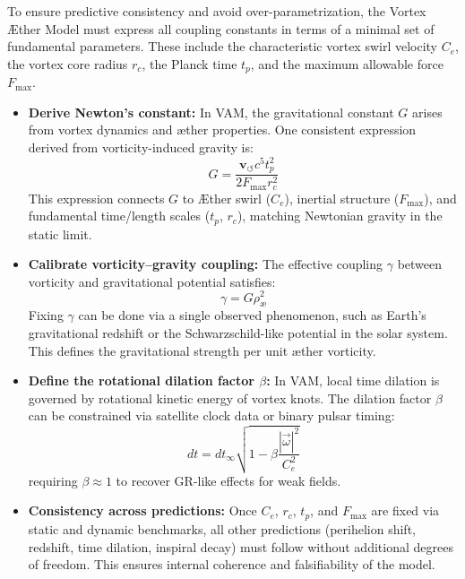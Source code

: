 To ensure predictive consistency and avoid over-parametrization, the Vortex Æther Model must express all coupling constants in terms of a minimal set of fundamental parameters. These include the characteristic vortex swirl velocity $C_e$, the vortex core radius $r_c$, the Planck time $t_p$, and the maximum allowable force $F_{\max}$.

\begin{itemize}
    \item \textbf{Derive Newton's constant:} In VAM, the gravitational constant $G$ arises from vortex dynamics and æther properties. One consistent expression derived from vorticity-induced gravity is:
    \begin{equation}
        G = \frac{\mathbf{v}_{\scriptscriptstyle\boldsymbol{\circlearrowleft}} c^5 t_p^2}{2 F_{\max} r_c^2}
    \end{equation}
    This expression connects $G$ to Æther swirl ($C_e$), inertial structure ($F_{\max}$), and fundamental time/length scales ($t_p$, $r_c$), matching Newtonian gravity in the static limit.

    \item \textbf{Calibrate vorticity–gravity coupling:} The effective coupling $\gamma$ between vorticity and gravitational potential satisfies:
    \begin{equation}
        \gamma = G \rho_\text{\ae}^2
    \end{equation}
    Fixing $\gamma$ can be done via a single observed phenomenon, such as Earth's gravitational redshift or the Schwarzschild-like potential in the solar system. This defines the gravitational strength per unit æther vorticity.

    \item \textbf{Define the rotational dilation factor $\beta$:} In VAM, local time dilation is governed by rotational kinetic energy of vortex knots. The dilation factor $\beta$ can be constrained via satellite clock data or binary pulsar timing:
    \[
    dt = dt_\infty \sqrt{1 - \beta \frac{|\vec{\omega}|^2}{C_e^2}}
    \]
    requiring $\beta \approx 1$ to recover GR-like effects for weak fields.

    \item \textbf{Consistency across predictions:} Once $C_e$, $r_c$, $t_p$, and $F_{\max}$ are fixed via static and dynamic benchmarks, all other predictions (perihelion shift, redshift, time dilation, inspiral decay) must follow without additional degrees of freedom. This ensures internal coherence and falsifiability of the model.
\end{itemize}


